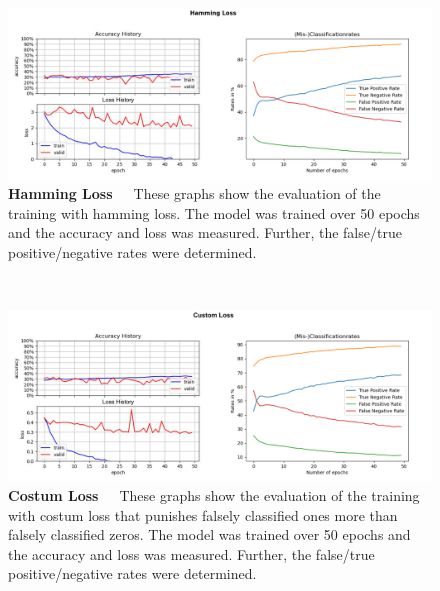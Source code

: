 \begin{figure}[h]
	\centering
	\includegraphics[scale=0.37]{Figures/chapter04/multilabel_hamming.png}
	\decoRule
	\caption[Hamming Loss]{\textbf{Hamming Loss}~~~These graphs show the evaluation of the training with hamming loss. The model was trained over 50 epochs and the accuracy and loss was measured. Further, the false/true positive/negative rates were determined.}
	\label{fig:MultilabelHammingLoss}
\end{figure}
\\
\begin{figure}[h]
	\centering
	\includegraphics[scale=0.37]{Figures/chapter04/multilabel_costum.png}
	\decoRule
	\caption[Costum Loss]{\textbf{Costum Loss}~~~These graphs show the evaluation of the training with costum loss that punishes falsely classified ones more than falsely classified zeros. The model was trained over 50 epochs and the accuracy and loss was measured. Further, the false/true positive/negative rates were determined.}
	\label{fig:MultilabelCostumLoss}
\end{figure}
\\
